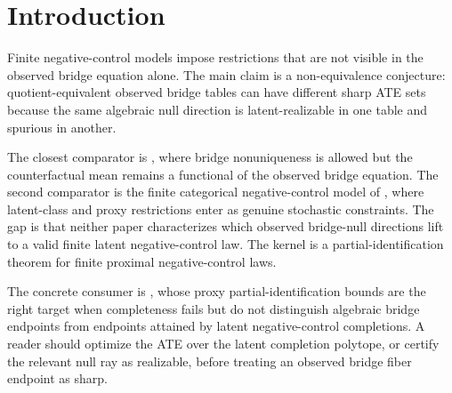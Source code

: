 \documentclass[11pt]{article}
\theoremstyle{definition}
\theoremstyle{plain}
\theoremstyle{remark}
\begin{document}
\begin{abstract}
Finite proximal bridge equations can have nonunique bridge solutions even when an algebraic quotient certifies that a linear functional is invariant on the observed bridge fiber. This proposal asks whether that quotient certificate preserves the sharp causal set once bridge-null directions must be realized by a finite negative-control latent law. The flagship conjecture states that two strictly positive finite observed laws can have the same bridge-operator nullspace and the same null-annihilator quotient certificate, but different sharp ATE sets because their latent-realizable null cones differ. The focal object is the latent-realizable null cone \(R_P\), a Farkas-type cone cut out by nonnegative latent strata and negative-control exclusions. Resolving the conjecture would separate algebraic proximal bridge fibers from causal latent-model fibers and would give partial-identification proximal analyses a finite witness check before optimizing over bridge-null directions.
\end{abstract}

\section{Introduction}
Finite negative-control models impose restrictions that are not visible in the observed bridge equation alone. The main claim is a non-equivalence conjecture: quotient-equivalent observed bridge tables can have different sharp ATE sets because the same algebraic null direction is latent-realizable in one table and spurious in another.

The closest comparator is \citet[p. 2 and Theorem 1]{zhang2023proximalNonunique}, where bridge nonuniqueness is allowed but the counterfactual mean remains a functional of the observed bridge equation. The second comparator is the finite categorical negative-control model of \citet[Section 2.2]{shi2020multiplyRobustDNC}, where latent-class and proxy restrictions enter as genuine stochastic constraints. The gap is that neither paper characterizes which observed bridge-null directions lift to a valid finite latent negative-control law. The kernel is a partial-identification theorem for finite proximal negative-control laws.

The concrete consumer is \citet{ghassami2023partialProxy}, whose proxy partial-identification bounds are the right target when completeness fails but do not distinguish algebraic bridge endpoints from endpoints attained by latent negative-control completions. A reader should optimize the ATE over the latent completion polytope, or certify the relevant null ray as realizable, before treating an observed bridge fiber endpoint as sharp.
\end{document}
